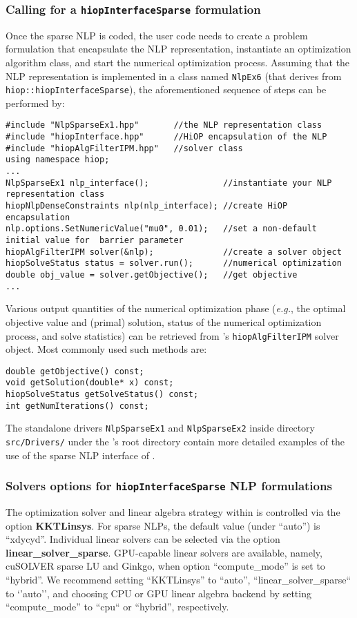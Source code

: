 \subsubsection{Calling \Hi for a \texttt{hiopInterfaceSparse} formulation}
Once the sparse NLP is coded,  the  user code needs to create a \Hi problem formulation that encapsulate the NLP representation, instantiate an optimization algorithm class, and start the numerical optimization process. Assuming that the NLP representation is implemented in a class named \texttt{NlpEx6} (that derives from \texttt{hiop::hiopInterfaceSparse}), the aforementioned sequence of steps can be performed by:
\begin{lstlisting}
#include "NlpSparseEx1.hpp"       //the NLP representation class
#include "hiopInterface.hpp"      //HiOP encapsulation of the NLP
#include "hiopAlgFilterIPM.hpp"   //solver class
using namespace hiop;
...
NlpSparseEx1 nlp_interface();               //instantiate your NLP representation class
hiopNlpDenseConstraints nlp(nlp_interface); //create HiOP encapsulation
nlp.options.SetNumericValue("mu0", 0.01);   //set a non-default initial value for  barrier parameter
hiopAlgFilterIPM solver(&nlp);              //create a solver object
hiopSolveStatus status = solver.run();      //numerical optimization
double obj_value = solver.getObjective();   //get objective
...
\end{lstlisting}
Various output quantities of the numerical optimization phase (\textit{e.g.}, the optimal objective value and (primal) solution, status of the numerical optimization process, and solve statistics) can be retrieved from \Hi's \texttt{hiopAlgFilterIPM} solver object. Most commonly used such methods are: 
\begin{lstlisting}
double getObjective() const;
void getSolution(double* x) const;
hiopSolveStatus getSolveStatus() const;
int getNumIterations() const;
\end{lstlisting} 
The standalone drivers \texttt{NlpSparseEx1} and \texttt{NlpSparseEx2} inside directory \texttt{src/Drivers/} under the \Hi's root directory contain more detailed examples of the use of the sparse NLP interface of \Hi.

\subsubsection{Solvers options  for \texttt{hiopInterfaceSparse} NLP formulations}

The optimization solver and linear algebra strategy within is controlled via the option  \textbf{KKTLinsys}. For sparse NLPs, the default value (under ``auto'') is ``xdycyd''. Individual linear solvers can be selected via the option \textbf{linear\_solver\_sparse}.  GPU-capable linear solvers are available, namely, cuSOLVER sparse LU and Ginkgo, when option ``compute\_mode'' is set to ``hybrid''. We recommend setting ``KKTLinsys'' to ``auto'', ``linear\_solver\_sparse`` to `'auto'', and choosing CPU or GPU linear algebra backend by setting ``compute\_mode'' to ``cpu`` or ``hybrid'', respectively. 


